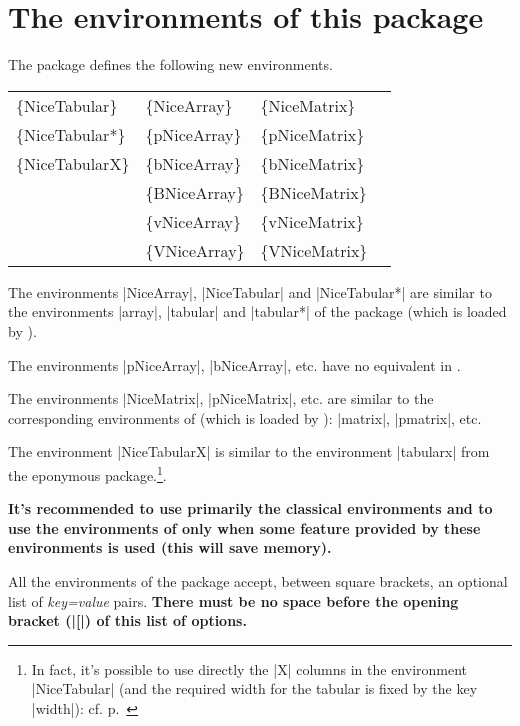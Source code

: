 \documentclass[dvipsnames]{article}%
\begin{document}
\newpage

\section{The environments of this package} 

The package  defines the following new environments.

\medskip
\begin{ttfamily}
\setlength{\tabcolsep}{3mm}
\begin{tabular}{llll}
\{NiceTabular\}  & \{NiceArray\}  & \{NiceMatrix\}   \\
\{NiceTabular*\} & \{pNiceArray\} & \{pNiceMatrix\}  \\
\{NiceTabularX\} & \{bNiceArray\} & \{bNiceMatrix\}  \\
                 & \{BNiceArray\} & \{BNiceMatrix\}  \\
                 & \{vNiceArray\} & \{vNiceMatrix\}  \\
                 & \{VNiceArray\} & \{VNiceMatrix\}  
\end{tabular}
\end{ttfamily}

%
\medskip
The environments |{NiceArray}|, |{NiceTabular}| and |{NiceTabular*}| are
similar to the environments |{array}|, |{tabular}| and |{tabular*}| of the
package  (which is loaded by ).

\medskip
The environments |{pNiceArray}|, |{bNiceArray}|, etc. have no equivalent in
. 

\medskip
The environments |{NiceMatrix}|, |{pNiceMatrix}|, etc. are similar to the
corresponding environments of  (which is loaded by
): |{matrix}|, |{pmatrix}|, etc. 

\medskip
The environment |{NiceTabularX}| is similar to the environment |{tabularx}|
from the eponymous package.\footnote{In fact, it's possible to use directly the
|X| columns in the environment |{NiceTabular}| (and the required
width for the tabular is fixed by the key |width|): cf. p.~\pageref{X-columns}}.

\medskip
\textbf{It's recommended to use primarily the classical environments and to use the
environments of  only when some feature provided by these
environments is used (this will save memory).}

\medskip 
All the environments of the package  accept, between square
brackets, an optional list of \textsl{key=value} pairs. \textbf{There must be
no space before the opening bracket (|[|) of this list of options.}
\end{document}
